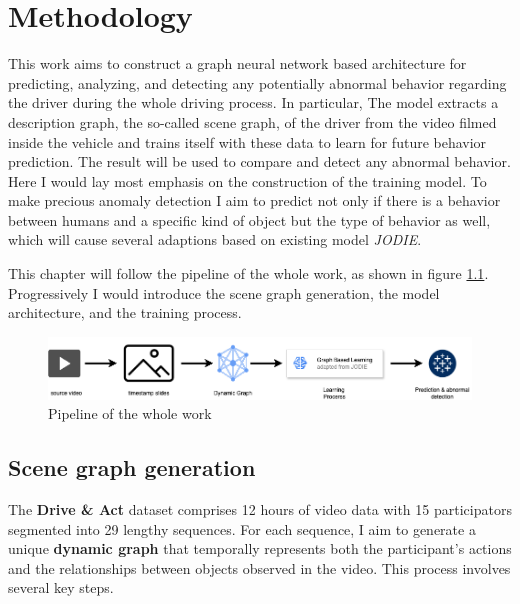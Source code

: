 \chapter{Methodology}\label{chapter:methodology}



This work aims to construct a graph neural network based architecture for predicting, analyzing, and detecting any potentially abnormal behavior regarding the driver during the whole driving process. In particular, The model extracts a description graph, the so-called scene graph, of the driver from the video filmed inside the vehicle and trains itself with these data to learn for future behavior prediction. The result will be used to compare and detect any abnormal behavior. Here I would lay most emphasis on the construction of the training model. To make precious anomaly detection I aim to predict not only if there is a behavior between humans and a specific kind of object but the type of behavior as well, which will cause several adaptions based on existing model \textit{JODIE}. 

This chapter will follow the pipeline of the whole work, as shown in figure \ref{fig:pipeline}. Progressively I would introduce the scene graph generation, the model architecture, and the training process. 

\begin{figure}
    \centering
    \includegraphics[width=\linewidth]{figures/04_pipeline.png}
    \caption{Pipeline of the whole work}
    \label{fig:pipeline}
\end{figure}


\section{Scene graph generation}

The \textbf{Drive \& Act} dataset comprises 12 hours of video data with 15 participators segmented into 29 lengthy sequences. For each sequence, I aim to generate a unique \textbf{dynamic graph} that temporally represents both the participant's actions and the relationships between objects observed in the video. This process involves several key steps.


